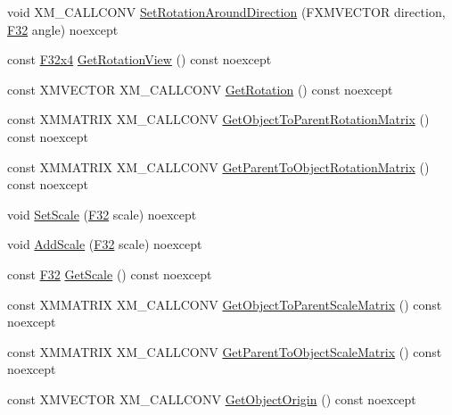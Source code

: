 \begin{DoxyCompactItemize}
\item 
void X\+M\+\_\+\+C\+A\+L\+L\+C\+O\+NV \mbox{\hyperlink{classmage_1_1_s1_q_t_transform3_d_abca411fa33ee661128acdb2b351d0034}{Set\+Rotation\+Around\+Direction}} (F\+X\+M\+V\+E\+C\+T\+OR direction, \mbox{\hyperlink{namespacemage_aa97e833b45f06d60a0a9c4fc22ae02c0}{F32}} angle) noexcept
\item 
const \mbox{\hyperlink{namespacemage_a851648f37dfb126a2d2f973e102861ad}{F32x4}} \mbox{\hyperlink{classmage_1_1_s1_q_t_transform3_d_a0dba405f65e9c31520b08bddb35ba40c}{Get\+Rotation\+View}} () const noexcept
\item 
const X\+M\+V\+E\+C\+T\+OR X\+M\+\_\+\+C\+A\+L\+L\+C\+O\+NV \mbox{\hyperlink{classmage_1_1_s1_q_t_transform3_d_a1099be1aeb8a1c6f3a7ec7be8ae03edd}{Get\+Rotation}} () const noexcept
\item 
const X\+M\+M\+A\+T\+R\+IX X\+M\+\_\+\+C\+A\+L\+L\+C\+O\+NV \mbox{\hyperlink{classmage_1_1_s1_q_t_transform3_d_a731e4fd8d1f5b353e8ef20e3de276909}{Get\+Object\+To\+Parent\+Rotation\+Matrix}} () const noexcept
\item 
const X\+M\+M\+A\+T\+R\+IX X\+M\+\_\+\+C\+A\+L\+L\+C\+O\+NV \mbox{\hyperlink{classmage_1_1_s1_q_t_transform3_d_a7400c38a3a11b6d08b551761772c3b13}{Get\+Parent\+To\+Object\+Rotation\+Matrix}} () const noexcept
\item 
void \mbox{\hyperlink{classmage_1_1_s1_q_t_transform3_d_a67bd668a5e0b2f76cbcfe1029a8a7e83}{Set\+Scale}} (\mbox{\hyperlink{namespacemage_aa97e833b45f06d60a0a9c4fc22ae02c0}{F32}} scale) noexcept
\item 
void \mbox{\hyperlink{classmage_1_1_s1_q_t_transform3_d_a18d0ee2e8bd12407ae3a2ed53e74c628}{Add\+Scale}} (\mbox{\hyperlink{namespacemage_aa97e833b45f06d60a0a9c4fc22ae02c0}{F32}} scale) noexcept
\item 
const \mbox{\hyperlink{namespacemage_aa97e833b45f06d60a0a9c4fc22ae02c0}{F32}} \mbox{\hyperlink{classmage_1_1_s1_q_t_transform3_d_a82ef7b135bfe6a05886e0cd0177a05c0}{Get\+Scale}} () const noexcept
\item 
const X\+M\+M\+A\+T\+R\+IX X\+M\+\_\+\+C\+A\+L\+L\+C\+O\+NV \mbox{\hyperlink{classmage_1_1_s1_q_t_transform3_d_a1d77c2e2bfc8649f4f150bd7f03844bd}{Get\+Object\+To\+Parent\+Scale\+Matrix}} () const noexcept
\item 
const X\+M\+M\+A\+T\+R\+IX X\+M\+\_\+\+C\+A\+L\+L\+C\+O\+NV \mbox{\hyperlink{classmage_1_1_s1_q_t_transform3_d_af4ddd29d84023da0b96c41eede9d850c}{Get\+Parent\+To\+Object\+Scale\+Matrix}} () const noexcept
\item 
const X\+M\+V\+E\+C\+T\+OR X\+M\+\_\+\+C\+A\+L\+L\+C\+O\+NV \mbox{\hyperlink{classmage_1_1_s1_q_t_transform3_d_ab13ce1c9306f0753d490f9f67dfbe716}{Get\+Object\+Origin}} () const noexcept

\end{DoxyCompactItemize}
